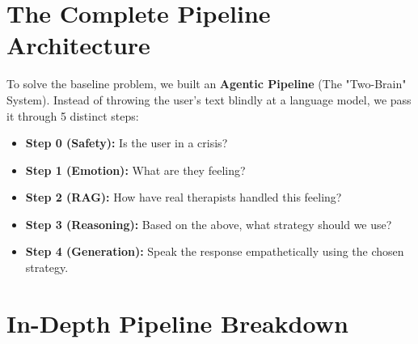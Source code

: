 \documentclass[12pt,a4paper]{article}
\begin{document}
\section{The Complete Pipeline Architecture}

To solve the baseline problem, we built an \textbf{Agentic Pipeline} (The "Two-Brain" System). Instead of throwing the user's text blindly at a language model, we pass it through 5 distinct steps:

\begin{itemize}
    \item \textbf{Step 0 (Safety):} Is the user in a crisis?
    \item \textbf{Step 1 (Emotion):} What are they feeling?
    \item \textbf{Step 2 (RAG):} How have real therapists handled this feeling?
    \item \textbf{Step 3 (Reasoning):} Based on the above, what strategy should we use?
    \item \textbf{Step 4 (Generation):} Speak the response empathetically using the chosen strategy.
\end{itemize}

\section{In-Depth Pipeline Breakdown}
\end{document}
